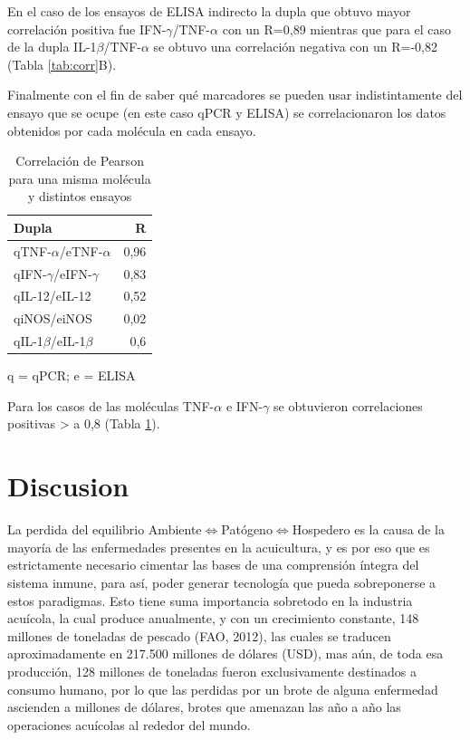 \documentclass[12pt,letterpaper,oneside]{scrbook}
\begin{document}
En el caso de los ensayos de ELISA indirecto la dupla que obtuvo mayor
correlación positiva fue IFN-\(\gamma\)/TNF-\(\alpha\) con un R=0,89
mientras que para el caso de la dupla IL-1\(\beta\)/TNF-\(\alpha\) se
obtuvo una correlación negativa con un R=-0,82 (Tabla \ref{tab:corr}B).

Finalmente con el fin de saber qué marcadores se pueden usar
indistintamente del ensayo que se ocupe (en este caso qPCR y ELISA) se
correlacionaron los datos obtenidos por cada molécula en cada ensayo.

\begin{table}[h!]
\centering
\begin{threeparttable}
\caption{Correlación de Pearson para una misma molécula y distintos ensayos}\label{r.pcr}\label{tab:corrtotal}
\begin{tabularx}{10cm}{X r}
  \toprule
    Dupla   &  R \\
  \midrule
qTNF-$\alpha$/eTNF-$\alpha$ & {\color{OliveGreen}0,96} \\
qIFN-$\gamma$/eIFN-$\gamma$ & {\color{OliveGreen}0,83} \\
qIL-12/eIL-12 & 0,52 \\
qiNOS/eiNOS & 0,02 \\
qIL-1$\beta$/eIL-1$\beta$ & 0,6 \\
 \bottomrule
   \end{tabularx}
   \begin{tablenotes}
    \item q = qPCR; e = ELISA
\end{tablenotes}
\end{threeparttable}
\end{table}

Para los casos de las moléculas TNF-\(\alpha\) e IFN-\(\gamma\) se
obtuvieron correlaciones positivas \textgreater{} a 0,8 (Tabla
\ref{tab:corrtotal}). \chapter{Discusion}

La perdida del equilibrio
Ambiente\(\Leftrightarrow\)Patógeno\(\Leftrightarrow\)Hospedero es la
causa de la mayoría de las enfermedades presentes en la acuicultura, y
es por eso que es estrictamente necesario cimentar las bases de una
comprensión íntegra del sistema inmune, para así, poder generar
tecnología que pueda sobreponerse a estos paradigmas. Esto tiene suma
importancia sobretodo en la industria acuícola, la cual produce
anualmente, y con un crecimiento constante, 148 millones de toneladas de
pescado (FAO, 2012), las cuales se traducen aproximadamente en 217.500
millones de dólares (USD), mas aún, de toda esa producción, 128 millones
de toneladas fueron exclusivamente destinados a consumo humano, por lo
que las perdidas por un brote de alguna enfermedad ascienden a millones
de dólares, brotes que amenazan las año a año las operaciones acuícolas
al rededor del mundo.
\end{document}
